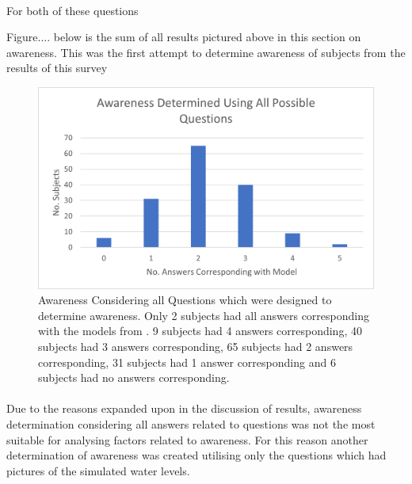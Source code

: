 \paragraph{}

For both of these questions 

Figure.... below is the sum of all results pictured above in this section on awareness. This was the first attempt to determine awareness of subjects from the results of this survey

\begin{figure}[h]
    \centering
    \includegraphics{fig_results/aware_all.png}
    \caption{Awareness Considering all Questions which were designed to determine awareness. Only 2 subjects had all answers corresponding with the models from \cite{kartverket_se_2020}. 9 subjects had 4 answers corresponding, 40 subjects had 3 answers corresponding, 65 subjects had 2 answers corresponding, 31 subjects had 1 answer corresponding and 6 subjects had no answers corresponding. }
    \label{fig:aware-all}
\end{figure}
\paragraph{}

Due to the reasons expanded upon in the discussion of results, awareness determination considering all answers related to questions was not the most suitable for analysing factors related to awareness. For this reason another determination of awareness was created utilising only the questions which had pictures of the simulated water levels. 
\paragraph{}

